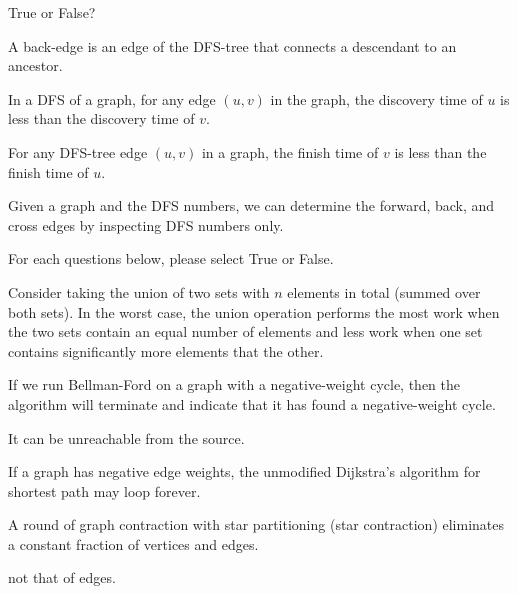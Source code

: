 \begin{problem}[DFS]
True or False? 

\asktf
A back-edge is an edge of the DFS-tree that connects a descendant to
an ancestor.
\solf

\asktf 

In a DFS of a graph, for any edge $(u,v)$ in the graph, the discovery
time of $u$ is less than the discovery time of $v$.  

\solf

\asktf 
For any DFS-tree edge $(u,v)$ in a graph, the finish time of $v$ is
less than the finish time of $u$.  
\solt

\asktf 
Given a graph and the DFS numbers, we can determine the
forward, back, and cross edges by inspecting DFS numbers only.  
\solt

\end{problem}


\begin{problem}[10.][Miscellaneous]

For each questions below, please select True or False.

\asktf

Consider taking the union of two sets with $n$ elements in total
(summed over both sets).  In the worst case, the union operation
performs the most work when the two sets contain an equal number of
elements and less work when one set contains significantly more
elements that the other.

\solt



\asktf

If we run Bellman-Ford on a graph with a negative-weight cycle, then
the algorithm will terminate and indicate that it has found a
negative-weight cycle.

\solf
It can be unreachable from the source.

\asktf

If a graph has negative edge weights, the unmodified Dijkstra's
algorithm for shortest path may loop forever.

\solf

\asktf 

A round of graph contraction with star partitioning (star contraction)
eliminates a constant fraction of vertices and edges.

\solf
not that of edges.

\end{problem}

